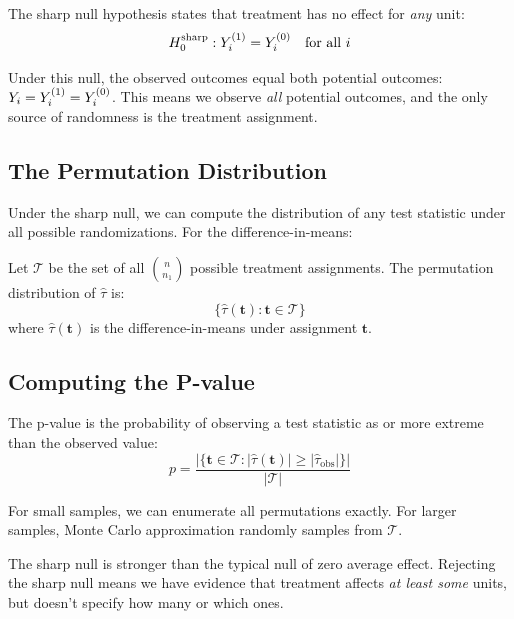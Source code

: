 The sharp null hypothesis states that treatment has no effect for \emph{any} unit:
\begin{equation}
H_0^{\text{sharp}}: Y^{(1)}_i = Y^{(0)}_i \quad \text{for all } i
\label{eq:sharp_null}
\end{equation}

Under this null, the observed outcomes equal both potential outcomes: $Y_i = Y^{(1)}_i = Y^{(0)}_i$. This means we observe \emph{all} potential outcomes, and the only source of randomness is the treatment assignment.

\subsection{The Permutation Distribution}

Under the sharp null, we can compute the distribution of any test statistic under all possible randomizations. For the difference-in-means:

\begin{definition}
\label{def:perm_dist}
Let $\mathcal{T}$ be the set of all $\binom{n}{n_1}$ possible treatment assignments. The permutation distribution of $\hat{\tau}$ is:
\begin{equation}
\{\hat{\tau}(\mathbf{t}) : \mathbf{t} \in \mathcal{T}\}
\end{equation}
where $\hat{\tau}(\mathbf{t})$ is the difference-in-means under assignment $\mathbf{t}$.
\end{definition}

\subsection{Computing the P-value}

The p-value is the probability of observing a test statistic as or more extreme than the observed value:
\begin{equation}
p = \frac{|\{\mathbf{t} \in \mathcal{T} : |\hat{\tau}(\mathbf{t})| \geq |\hat{\tau}_{\text{obs}}|\}|}{|\mathcal{T}|}
\label{eq:perm_pvalue}
\end{equation}

For small samples, we can enumerate all permutations exactly. For larger samples, Monte Carlo approximation randomly samples from $\mathcal{T}$.

\begin{remark}
The sharp null is stronger than the typical null of zero average effect. Rejecting the sharp null means we have evidence that treatment affects \emph{at least some} units, but doesn't specify how many or which ones.
\end{remark}

